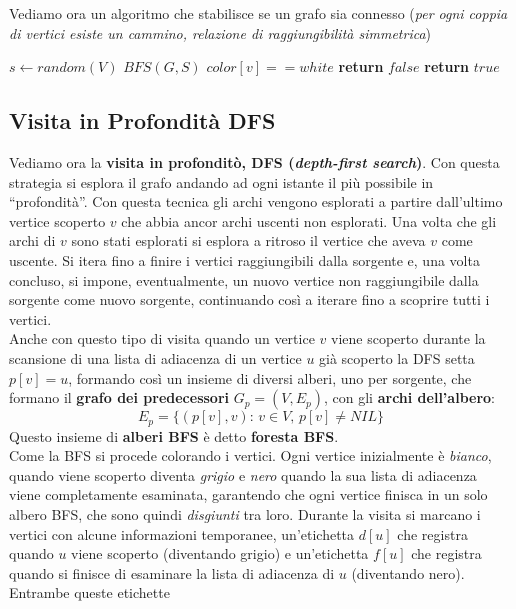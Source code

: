 \documentclass[a4paper,12pt, oneside]{book}
\begin{document}
Vediamo ora un algoritmo che stabilisce se un grafo sia connesso
(\textit{per ogni coppia di vertici esiste un cammino, relazione di
  raggiungibilità simmetrica})
\begin{shaded}
  \begin{algorithmic}
    \State $s\gets random(V)$
    \State $BFS(G, S)$
    \If $color[v]==white$
    \State \textbf{return }$false$
    \Else
    \State \textbf{return }$true$
    \EndIf
    \EndFor
    \EndFunction
  \end{algorithmic}
\end{shaded}
\subsection{Visita in Profondità DFS}
Vediamo ora la \textbf{visita in profonditò, DFS (\textit{depth-first
    search})}. Con questa strategia si esplora il grafo andando ad
ogni istante il più possibile in ``profondità''. Con questa tecnica
gli archi vengono esplorati a partire dall'ultimo vertice scoperto $v$
che abbia ancor archi uscenti non esplorati. Una volta che gli archi
di $v$ sono stati esplorati si esplora a ritroso il vertice che aveva
$v$ come uscente. Si itera fino a finire i vertici raggiungibili dalla
sorgente e, una volta concluso, si impone, eventualmente, un nuovo
vertice non raggiungibile dalla sorgente come nuovo sorgente,
continuando così a iterare fino a scoprire tutti i vertici. \\
Anche con questo tipo di visita quando un vertice $v$ viene scoperto
durante la scansione di una lista di adiacenza di un vertice $u$ già
scoperto la DFS setta $p[v]=u$, formando così un insieme di diversi
alberi, uno per sorgente, che formano il \textbf{grafo dei
  predecessori} $G_p=(V,E_p)$, con gli \textbf{archi dell'albero}:
\[E_p=\{(p[v],v):\,v\in V,\, p[v]\neq NIL\}\]
Questo insieme di \textbf{alberi BFS} è detto \textbf{foresta BFS}.\\
Come la BFS si procede colorando i vertici. Ogni vertice inizialmente
è \textit{bianco}, quando viene scoperto diventa \textit{grigio} e
\textit{nero} quando la sua lista di adiacenza viene completamente
esaminata, garantendo che ogni vertice finisca in un solo albero BFS,
che sono quindi \textit{disgiunti} tra loro. Durante la visita si
marcano i vertici con alcune informazioni temporanee, un'etichetta
$d[u]$ che registra quando $u$ viene scoperto (diventando grigio) e
un'etichetta $f[u]$ che registra quando si finisce di esaminare la
lista di adiacenza di $u$ (diventando nero). Entrambe queste etichette
\end{document}

